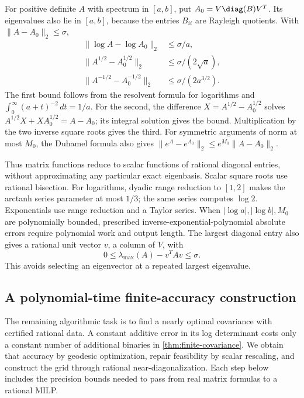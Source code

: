 For positive definite $A$ with spectrum in $[a,b]$, put
$A_0=V\diag(B)V^T$. Its eigenvalues also lie in $[a,b]$, because the
entries $B_{ii}$ are Rayleigh quotients. With $\|A-A_0\|_2\le\sigma$,
\begin{equation}\label{eq:matrix-function-bounds}
 \begin{split}
 \|\log A-\log A_0\|_2&\le\sigma/a,\\
 \|A^{1/2}-A_0^{1/2}\|_2&\le\sigma/(2\sqrt a),\\
 \|A^{-1/2}-A_0^{-1/2}\|_2&\le\sigma/(2a^{3/2}).
 \end{split}
\end{equation}
The first bound follows from the resolvent formula for logarithms and
$\int_0^\infty(a+t)^{-2}\,dt=1/a$. For the second, the difference
$X=A^{1/2}-A_0^{1/2}$ solves
$A^{1/2}X+XA_0^{1/2}=A-A_0$; its integral solution gives the bound.
Multiplication by the two inverse square roots gives the third. For
symmetric arguments of norm at most $M_0$, the Duhamel formula also gives
$\|e^A-e^{A_0}\|_2\le e^{M_0}\|A-A_0\|_2$.

Thus matrix functions reduce to scalar functions of rational diagonal
entries, without approximating any particular exact eigenbasis. Scalar
square roots use rational bisection. For logarithms, dyadic range reduction
to $[1,2]$ makes the arctanh series parameter at most $1/3$; the same
series computes $\log2$. Exponentials use range reduction and a Taylor
series. When $|\log a|,|\log b|,M_0$ are polynomially bounded, prescribed
inverse-exponential-polynomial absolute errors require polynomial work
and output length. The largest diagonal entry also gives a rational
unit vector $v$, a column of $V$, with
\begin{equation}\label{eq:rayleigh-residual}
 0\le\lambda_{\max}(A)-v^TAv\le\sigma.
\end{equation}
This avoids selecting an eigenvector at a repeated largest eigenvalue.

\subsection{A polynomial-time finite-accuracy construction}

The remaining algorithmic task is to find a nearly optimal covariance
with certified rational data. A constant additive error in its log
determinant costs only a constant number of additional binaries in
\cref{thm:finite-covariance}. We obtain that accuracy by geodesic
optimization, repair feasibility by scalar rescaling, and construct the
grid through rational near-diagonalization. Each step below includes the
precision bounds needed to pass from real matrix formulas to a rational
MILP.

